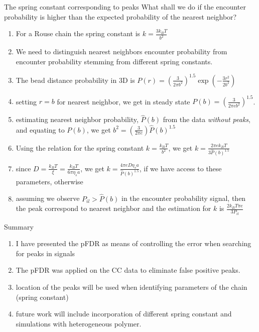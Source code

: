 \documentclass[8pt]{beamer}
\begin{document}
\begin{frame}{The spring constant corresponding to peaks}
What shall we do if the encounter probability is higher than the expected probability of the nearest neighbor?
\begin{enumerate}
\item For a Rouse chain the spring constant is $k=\frac{3k_BT}{b^2}$
\item We need to distinguish nearest neighbors encounter probability from encounter probability stemming from different spring constants.
\item The bead distance probability in 3D is $P(r)=\left(\frac{3}{2\pi b^2}\right)^{1.5}\exp\left(-\frac{3r^2}{2b^2} \right)$
\item setting $r=b$ for nearest neighbor, we get in steady state $P(b)=\left(\frac{3}{2\pi e b^2}\right)^{1.5}$.
\item estimating nearest neighbor probability, $\hat{P}(b)$ from the data \textit{without peaks}, and equating to $P(b)$, we get $ b^2 = \left(\frac{3}{2\pi e}\right)\hat{P}(b)^{1.5}$
\item Using the relation for the spring constant $k=\frac{k_BT}{b^2}$, we get $k=\frac{2\pi e k_BT}{3\hat{P}(b)^{1.5}}$
\item since $D=\frac{k_BT}{\xi}=\frac{k_BT}{6\pi\eta_s a}$, we get $k=\frac{4\pi eD \eta_s a}{\hat{P}(b)^{1.5}}$, if we have access to these parameters, otherwise
\item assuming we observe $P_{il}>\hat{P}(b)$ in the encounter probability signal, then the peak correspond to nearest neighbor and the estimation for $k$ is $ \frac{2k_BT\pi e}{3P_{il}}$
\end{enumerate}
\end{frame}

\begin{frame}{Summary}
\begin{enumerate}
\item I have presented the pFDR as means of controlling the error when searching for peaks in signals
\item The pFDR was applied on the CC data to eliminate false positive peaks. 
\item location of the peaks will be used when identifying parameters of the chain (spring constant)
\item future work will include incorporation of different spring constant and simulations with heterogeneous polymer.  
\end{enumerate}
\end{frame}
\end{document}
